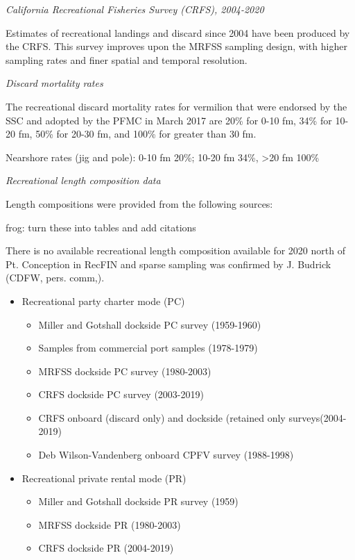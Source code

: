 \documentclass[11pt,
  english,
  a4paper,
]{article}
\begin{document}
\emph{California Recreational Fisheries Survey (CRFS), 2004-2020}

Estimates of recreational landings and discard since 2004 have been produced by the CRFS. This survey improves upon the MRFSS sampling design, with higher sampling rates and finer spatial and temporal resolution.

\emph{Discard mortality rates}

The recreational discard mortality rates for vermilion that were endorsed by the SSC and adopted by the PFMC in March 2017 are 20\% for 0-10 fm, 34\% for 10-20 fm, 50\% for 20-30 fm, and 100\% for greater than 30 fm.

Nearshore rates (jig and pole): 0-10 fm 20\%; 10-20 fm 34\%, \textgreater20 fm 100\%

\emph{Recreational length composition data}

Length compositions were provided from the following sources:

frog: turn these into tables and add citations

There is no available recreational length composition available for 2020 north of Pt. Conception in RecFIN and sparse sampling was confirmed by J. Budrick (CDFW, pers. comm,).

\begin{itemize}
  \item Recreational party charter mode (PC)
   \begin{itemize}
     \item Miller and Gotshall dockside PC survey (1959-1960) 
     \item Samples from commercial port samples (1978-1979)
     \item MRFSS dockside PC survey (1980-2003)    
     \item CRFS dockside PC survey (2003-2019)
     \item CRFS onboard (discard only) and dockside (retained only surveys(2004-2019)
     \item Deb Wilson-Vandenberg onboard CPFV survey (1988-1998)
   \end{itemize}
  \item Recreational private rental mode (PR)
   \begin{itemize}
     \item Miller and Gotshall dockside PR survey (1959) 
     \item MRFSS dockside PR (1980-2003)
     \item CRFS dockside PR (2004-2019)
  \end{itemize}
\end{itemize}
\end{document}
